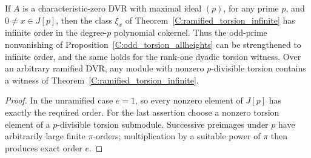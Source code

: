 \begin{corollary}
\label{C:unramified_torsion_infinite}
If $A$ is a characteristic-zero DVR with maximal ideal $(p)$,
for any prime $p$, and $0\ne x\in J[p]$, then the class $\xi_x$
of Theorem~\ref{C:ramified_torsion_infinite} has infinite order in
the degree-$p$ polynomial cokernel. Thus the odd-prime
nonvanishing of Proposition~\ref{C:odd_torsion_allheights} can be
strengthened to infinite order, and the same holds for the
rank-one dyadic torsion witness. Over an arbitrary ramified DVR,
any module with nonzero $p$-divisible torsion contains a witness
of Theorem~\ref{C:ramified_torsion_infinite}.
\end{corollary}
\begin{proof}
In the unramified case $e=1$, so every nonzero element of $J[p]$
has exactly the required order. For the last assertion choose a
nonzero torsion element of a $p$-divisible torsion submodule.
Successive preimages under $p$ have arbitrarily large finite
$\pi$-orders; multiplication by a suitable power of $\pi$ then
produces exact order $e$.
\end{proof}
